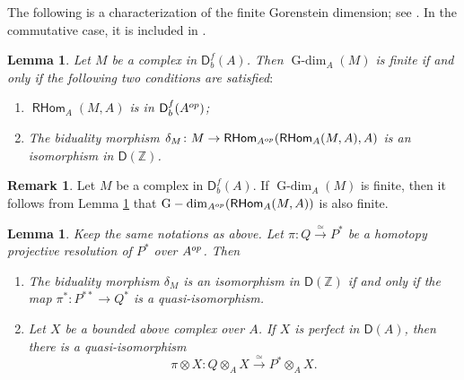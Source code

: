 \documentclass{amsart}
\newcommand{\Z}{\mathbb{Z}}
\newcommand{\D}{\mathsf{D}}
\newcommand{\0}{{\bf{0}}}
\DeclareMathOperator{\Gdim}{G-dim}
\DeclareMathOperator{\Hom}{Hom}
\DeclareMathOperator{\RHom}{\mathsf{RHom}}
\newtheorem{lemma}[theorem]{Lemma}
\theoremstyle{definition}
\newtheorem{remark}[theorem]{Remark}
\begin{document}
The following is a characterization of the finite Gorenstein dimension; see \cite[Theorem 10.4.5]{CFH}. In the commutative case, it is included in \cite[Corollary 2.3.8]{Chr00}.


\begin{lemma}\label{test}
Let $M$ be a complex in $\D^f_b(A)$. Then  $\Gdim_A(M)$ is finite if and only if the following two conditions are satisfied$\colon$
\begin{enumerate}
\item $\RHom_A(M,A)$ is in $\D^f_b(A^{\rm op})$;

\item The biduality morphism $\delta_M\colon M\rightarrow \RHom_{A^{\rm op}}(\RHom_A(M,A),A)$ is an isomorphism in $\D(\Z)$.
\end{enumerate}
\end{lemma}
\begin{remark}\label{dualfinite}
Let $M$ be a complex in $\D^f_b(A)$. If $\Gdim_A(M)$ is finite, then it follows from Lemma \ref{test} that $\Gdim_{A^{\rm op}}(\RHom_A(M,A))$ is also finite.

\end{remark}


\begin{lemma}\label{coincide}
Keep the same notations as above. Let $\pi\colon Q\xrightarrow\simeq P^\ast$ be a homotopy projective resolution of $P^\ast$ over $A^{\rm op}$. Then
\begin{enumerate}
\item The biduality morphism $\delta_M$ is an isomorphism in $\D(\Z)$ if and only if the map $\pi^\ast\colon P^{\ast\ast}\rightarrow Q^\ast$ is a quasi-isomorphism.

\item Let $X$ be a bounded above complex over $A$. If $X$ is perfect in $\D(A)$, then there is a quasi-isomorphism $$\pi\otimes X\colon Q\otimes_A X\xrightarrow\simeq  P^\ast\otimes_A X.$$
\end{enumerate}
\end{lemma}
\end{document}

